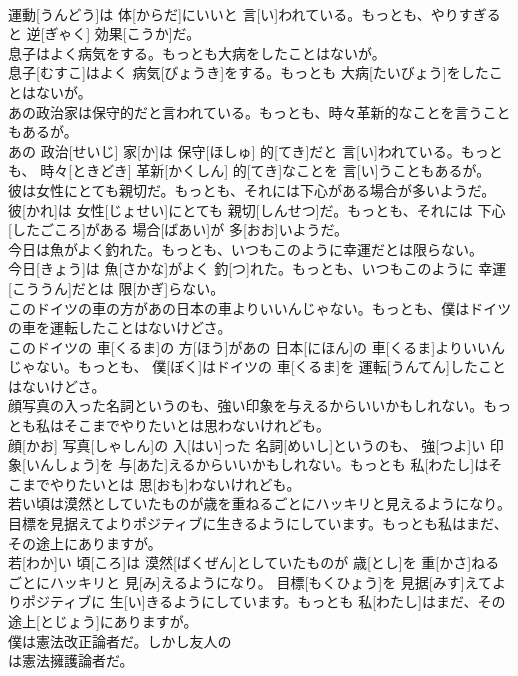 \documentclass[8pt]{extreport}
\begin{document}
\begin{CJK}{UTF8}{min}
\\	運動[うんどう]は 体[からだ]にいいと 言[い]われている。もっとも、やりすぎると 逆[ぎゃく] 効果[こうか]だ。
\\	息子はよく病気をする。もっとも大病をしたことはないが。	
\\	息子[むすこ]はよく 病気[びょうき]をする。もっとも 大病[たいびょう]をしたことはないが。
\\	あの政治家は保守的だと言われている。もっとも、時々革新的なことを言うこともあるが。	
\\	あの 政治[せいじ] 家[か]は 保守[ほしゅ] 的[てき]だと 言[い]われている。もっとも、 時々[ときどき] 革新[かくしん] 的[てき]なことを 言[い]うこともあるが。
\\	彼は女性にとても親切だ。もっとも、それには下心がある場合が多いようだ。	
\\	彼[かれ]は 女性[じょせい]にとても 親切[しんせつ]だ。もっとも、それには 下心[したごころ]がある 場合[ばあい]が 多[おお]いようだ。
\\	今日は魚がよく釣れた。もっとも、いつもこのように幸運だとは限らない。	
\\	今日[きょう]は 魚[さかな]がよく 釣[つ]れた。もっとも、いつもこのように 幸運[こううん]だとは 限[かぎ]らない。
\\	このドイツの車の方があの日本の車よりいいんじゃない。もっとも、僕はドイツの車を運転したことはないけどさ。	
\\	このドイツの 車[くるま]の 方[ほう]があの 日本[にほん]の 車[くるま]よりいいんじゃない。もっとも、 僕[ぼく]はドイツの 車[くるま]を 運転[うんてん]したことはないけどさ。
\\	顔写真の入った名詞というのも、強い印象を与えるからいいかもしれない。もっとも私はそこまでやりたいとは思わないけれども。	
\\	顔[かお] 写真[しゃしん]の 入[はい]った 名詞[めいし]というのも、 強[つよ]い 印象[いんしょう]を 与[あた]えるからいいかもしれない。もっとも 私[わたし]はそこまでやりたいとは 思[おも]わないけれども。
\\	若い頃は漠然としていたものが歳を重ねるごとにハッキリと見えるようになり。目標を見据えてよりポジティブに生きるようにしています。もっとも私はまだ、その途上にありますが。	
\\	若[わか]い 頃[ころ]は 漠然[ばくぜん]としていたものが 歳[とし]を 重[かさ]ねるごとにハッキリと 見[み]えるようになり。 目標[もくひょう]を 見据[みす]えてよりポジティブに 生[い]きるようにしています。もっとも 私[わたし]はまだ、その 途上[とじょう]にありますが。
\\	僕は憲法改正論者だ。しかし友人の
\\	は憲法擁護論者だ。	

\end{CJK}
\end{document}
